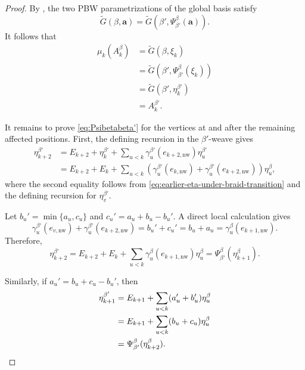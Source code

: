 \documentclass[12pt, reqno]{amsart}
\theoremstyle{plain}
\theoremstyle{definition}
\numberwithin{equation}{section}
\begin{document}
\begin{proof}
By \cite[Theorem~4.12]{bi2026towards}, the two PBW parametrizations of
the global basis satisfy
\[
    \widetilde G(\beta,\mathbf a)
    =
    \widetilde G\left(
        \beta',
        \Psi_{\beta'}^\beta(\mathbf a)
    \right).
\]
It follows that
\begin{align*}
    \mu_k(A_k^\beta)
    &=
    \widetilde G(\beta,\xi_k)\\
    &=
    \widetilde G\left(
        \beta',
        \Psi_{\beta'}^\beta(\xi_k)
    \right)\\
    &=
    \widetilde G\left(
        \beta',
        \eta_{k}^{\beta'}
    \right)\\
    &=
    A_{k}^{\beta'}.
\end{align*}

It remains to prove \eqref{eq:Psibetabeta'} for the vertices at and
after the remaining affected positions. First, the defining recursion
in the \(\beta'\)-weave gives
\begin{align*}
    \eta_{k+2}^{\beta'}
    &=
    E_{k+2}
    +
    \eta_k^{\beta'}
    +
    \sum_{u<k}
        \gamma_{u}^{\beta'}(e_{k+2,\mathrm{nw}})
        \eta_{u}^{\beta'}\\
    &=
    E_{k+2}
    +
    E_k
    +
    \sum_{u<k}
        \left(
            \gamma_{u}^{\beta'}(e_{k,\mathrm{nw}})
            +
            \gamma_{u}^{\beta'}(e_{k+2,\mathrm{nw}})
        \right)
        \eta_u^\beta,
\end{align*}
where the second equality follows from
\eqref{eq:earlier-eta-under-braid-transition} and the defining
recursion for \(\eta_v^{\beta'}\).

Let \(b_u'=\min\{a_u,c_u\}\) and
\(c_u'=a_u+b_u-b_u'\). A direct local calculation gives
\[
    \gamma_{u}^{\beta'}(e_{v,\mathrm{nw}})
    +
    \gamma_{u}^{\beta'}(e_{k+2,\mathrm{nw}})
    =
    b_u'+c_u'
    =
    b_u+a_u
    =
    \gamma_u^\beta(e_{k+1,\mathrm{nw}}).
\]
Therefore,
\begin{equation}\label{eq:etak+2}
    \eta_{k+2}^{\beta'}
    =
    E_{k+2}
    +
    E_k
    +
    \sum_{u<k}
        \gamma_u^\beta(e_{k+1,\mathrm{nw}})
        \eta_u^\beta
    =
    \Psi_{\beta'}^\beta(\eta_{k+1}^\beta).
\end{equation}

Similarly, if \(a_u'=b_u+c_u-b_u'\), then
\begin{align}
    \eta_{k+1}^{\beta'}
    &=
    E_{k+1}
    +
    \sum_{u<k}
        (a_u'+b_u')
        \eta_u^\beta \notag\\
    &=
    E_{k+1}
    +
    \sum_{u<k}
        (b_u+c_u)
        \eta_u^\beta \notag\\
    &=
    \Psi_{\beta'}^\beta(\eta_{k+2}^\beta).
    \label{eq:etak+1}
\end{align}



\end{proof}
\end{document}

